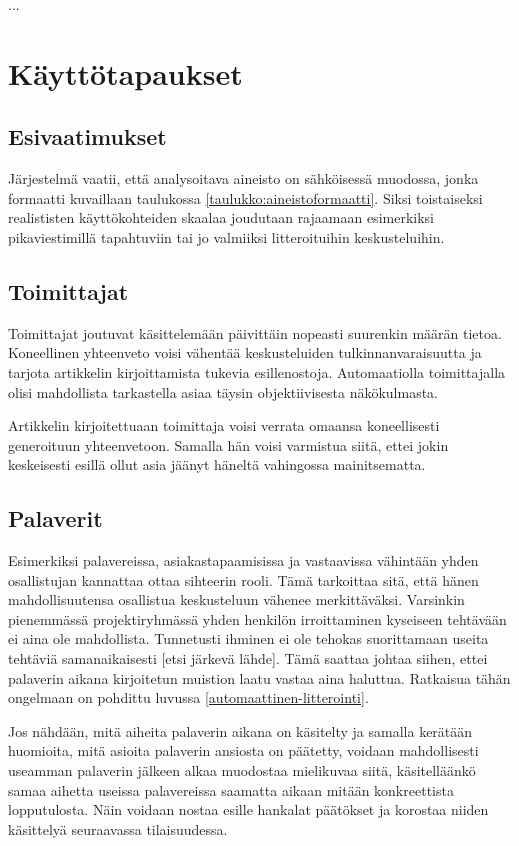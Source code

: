 \documentclass[11pt,a4paper,oneside]{memoir}
\begin{document}
...

\chapter{Käyttötapaukset}

\section{Esivaatimukset}
Järjestelmä vaatii, että analysoitava aineisto on sähköisessä muodossa, jonka formaatti kuvaillaan taulukossa \ref{taulukko:aineistoformaatti}. Siksi toistaiseksi realististen käyttökohteiden skaalaa joudutaan rajaamaan esimerkiksi pikaviestimillä tapahtuviin tai jo valmiiksi litteroituihin keskusteluihin.

\section{Toimittajat}
Toimittajat joutuvat käsittelemään päivittäin nopeasti suurenkin määrän tietoa. Koneellinen yhteenveto voisi vähentää keskusteluiden tulkinnanvaraisuutta ja tarjota artikkelin kirjoittamista tukevia esillenostoja. Automaatiolla toimittajalla olisi mahdollista tarkastella asiaa täysin objektiivisesta näkökulmasta.

Artikkelin kirjoitettuaan toimittaja voisi verrata omaansa koneellisesti generoituun yhteenvetoon. Samalla hän voisi varmistua siitä, ettei jokin keskeisesti esillä ollut asia jäänyt häneltä vahingossa mainitsematta.

\section{Palaverit}
Esimerkiksi palavereissa, asiakastapaamisissa ja vastaavissa vähintään yhden osallistujan kannattaa ottaa sihteerin rooli. Tämä tarkoittaa sitä, että hänen mahdollisuutensa osallistua keskusteluun vähenee merkittäväksi. Varsinkin pienemmässä projektiryhmässä yhden henkilön irroittaminen kyseiseen tehtävään ei aina ole mahdollista. Tunnetusti ihminen ei ole tehokas suorittamaan useita tehtäviä samanaikaisesti [etsi järkevä lähde]. Tämä saattaa johtaa siihen, ettei palaverin aikana kirjoitetun muistion laatu vastaa aina haluttua. Ratkaisua tähän ongelmaan on pohdittu luvussa \ref{automaattinen-litterointi}.

Jos nähdään, mitä aiheita palaverin aikana on käsitelty ja samalla kerätään huomioita, mitä asioita palaverin ansiosta on päätetty, voidaan mahdollisesti useamman palaverin jälkeen alkaa muodostaa mielikuvaa siitä, käsitelläänkö samaa aihetta useissa palavereissa saamatta aikaan mitään konkreettista lopputulosta. Näin voidaan nostaa esille hankalat päätökset ja korostaa niiden käsittelyä seuraavassa tilaisuudessa.
\end{document}
